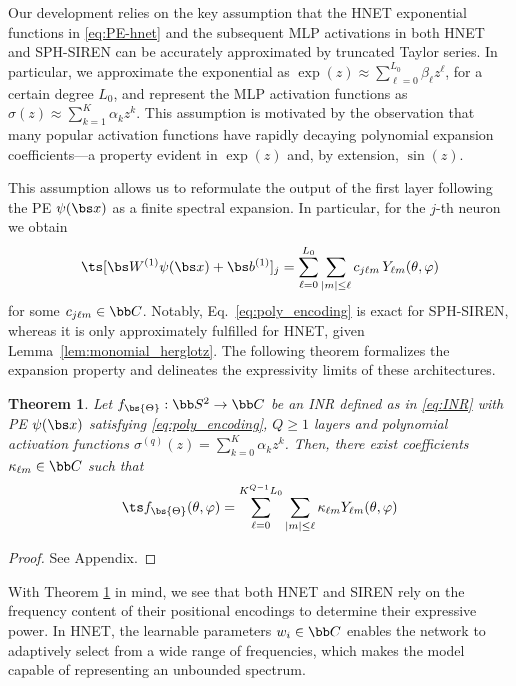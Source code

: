 \documentclass[conference]{IEEEtran}
\newtheorem{theorem}{Theorem}
\begin{document}
Our development relies on the key assumption that the HNET exponential functions in \eqref{eq:PE-hnet} and the subsequent MLP activations in both HNET and SPH-SIREN can be accurately approximated by truncated Taylor series. In particular, we approximate the exponential as $\exp(z) \approx \sum_{\ell=0}^{L_0} \beta_\ell z^\ell$, for a certain degree $L_0$, and represent the MLP activation functions as $\sigma(z) \approx \sum_{k=1}^{K} \alpha_k z^k$.
This assumption is motivated by the observation that many popular activation functions have rapidly decaying polynomial expansion coefficients—a property evident in $\exp(z)$ and, by extension, $\sin(z)$. 

This assumption allows us to reformulate the output of the first layer following the PE $\psi(\bs x)$ as a finite spectral expansion. In particular, for the \(j\)-th neuron we obtain
\begin{equation}
    \label{eq:poly_encoding}
\ts [\bs W^{(1)} \psi(\bs x) + \bs b^{(1)}]_j = \sum_{\ell=0}^{L_0}\sum_{|m| \leq \ell} c_{j\ell m}\, Y_{\ell m}(\theta,\varphi)
\end{equation}
for some $c_{j\ell m}\in \bb C$. Notably, Eq.~\eqref{eq:poly_encoding} is exact for SPH-SIREN, whereas it is only approximately fulfilled for HNET, given Lemma~\ref{lem:monomial_herglotz}. The following theorem formalizes the expansion property and delineates the expressivity limits of these architectures.
\begin{theorem}
    \label{theorem:limited_representation}
    Let $f_{\bs{\Theta}} : \bb S^2 \rightarrow \bb C$ be an INR  defined as in \eqref{eq:INR} with PE $\psi(\bs x)$ satisfying \eqref{eq:poly_encoding}, $Q \geq 1$ layers and polynomial activation functions $\sigma^{(q)}(z) = \sum_{k=0}^K \alpha_k z^k$. Then, there exist coefficients $\kappa_{\ell m} \in \bb C$ such that    
    \begin{equation}
        \ts f_{\bs{\Theta}}(\theta,\varphi) = \sum_{\ell=0}^{K^{Q-1} L_0}\sum_{|m| \leq \ell} \kappa_{\ell m} Y_{\ell m}(\theta,\varphi)
    \end{equation}
\end{theorem}
\begin{proof}
    See Appendix.
\end{proof}
With Theorem \ref{theorem:limited_representation} in mind, we see that both HNET and SIREN rely on the frequency content of their positional encodings to determine their expressive power. In HNET, the learnable parameters $w_i\in \bb C$ enables the network to adaptively select from a wide range of frequencies, which makes the model capable of representing an unbounded spectrum. 
\end{document}

